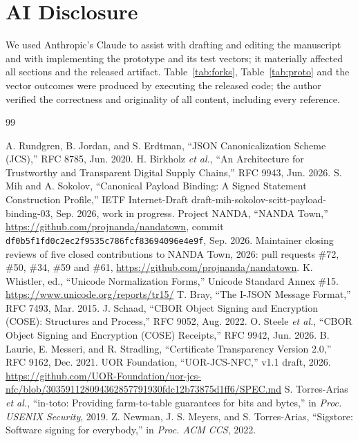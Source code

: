 \documentclass[conference]{IEEEtran}
\begin{document}
\section*{AI Disclosure}
We used Anthropic's Claude to assist with drafting and editing the manuscript and with implementing the prototype and its test vectors; it materially affected all sections and the released artifact. Table~\ref{tab:forks}, Table~\ref{tab:proto} and the vector outcomes were produced by executing the released code; the author verified the correctness and originality of all content, including every reference.

\begin{thebibliography}{99}\scriptsize\raggedright
\setlength{\itemsep}{0pt}\setlength{\parsep}{0pt}\setlength{\topsep}{0pt}
 A. Rundgren, B. Jordan, and S. Erdtman, ``JSON Canonicalization Scheme (JCS),'' RFC 8785, Jun. 2020.
 H. Birkholz \emph{et al.}, ``An Architecture for Trustworthy and Transparent Digital Supply Chains,'' RFC 9943, Jun. 2026.
 S. Mih and A. Sokolov, ``Canonical Payload Binding: A Signed Statement Construction Profile,'' IETF Internet-Draft draft-mih-sokolov-scitt-payload-binding-03, Sep. 2026, work in progress.
 Project NANDA, ``NANDA Town,'' \url{https://github.com/projnanda/nandatown}, commit \texttt{df0b5f1fd0c2ec2f9535c786fcf83694096e4e9f}, Sep. 2026.
 Maintainer closing reviews of five closed contributions to NANDA Town, 2026: pull requests \#72, \#50, \#34, \#59 and \#61, \url{https://github.com/projnanda/nandatown}.
 K. Whistler, ed., ``Unicode Normalization Forms,'' Unicode Standard Annex \#15. \url{https://www.unicode.org/reports/tr15/}
 T. Bray, ``The I-JSON Message Format,'' RFC 7493, Mar. 2015.
 J. Schaad, ``CBOR Object Signing and Encryption (COSE): Structures and Process,'' RFC 9052, Aug. 2022.
 O. Steele \emph{et al.}, ``CBOR Object Signing and Encryption (COSE) Receipts,'' RFC 9942, Jun. 2026.
 B. Laurie, E. Messeri, and R. Stradling, ``Certificate Transparency Version 2.0,'' RFC 9162, Dec. 2021.
 UOR Foundation, ``UOR-JCS-NFC,'' v1.1 draft, 2026. \url{https://github.com/UOR-Foundation/uor-jcs-nfc/blob/303591128094362857791930fdc12b73875d1ff6/SPEC.md}
 S. Torres-Arias \emph{et al.}, ``in-toto: Providing farm-to-table guarantees for bits and bytes,'' in \emph{Proc. USENIX Security}, 2019.
 Z. Newman, J. S. Meyers, and S. Torres-Arias, ``Sigstore: Software signing for everybody,'' in \emph{Proc. ACM CCS}, 2022.

\end{thebibliography}
\end{document}
